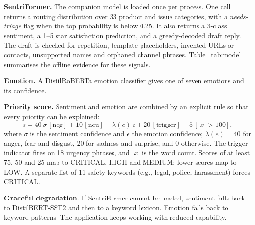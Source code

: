 \documentclass[conference]{IEEEtran}
\begin{document}
\textbf{SentriFormer.} The companion model is loaded once per process. One call returns a routing distribution over 33 product and issue categories, with a \emph{needs-triage} flag when the top probability is below 0.25. It also returns a 3-class sentiment, a 1--5 star satisfaction prediction, and a greedy-decoded draft reply. The draft is checked for repetition, template placeholders, invented URLs or contacts, unsupported names and orphaned channel phrases. Table~\ref{tab:model} summarises the offline evidence for these signals.

\textbf{Emotion.} A DistilRoBERTa emotion classifier gives one of seven emotions and its confidence.

\textbf{Priority score.} Sentiment and emotion are combined by an explicit rule so that every priority can be explained:
\begin{equation}
s = 40\,\sigma\,[\text{neg}] + 10\,[\text{neu}] + \lambda(e)\,\epsilon + 20\,[\text{trigger}] + 5\,[|x|>100],
\end{equation}
where $\sigma$ is the sentiment confidence and $\epsilon$ the emotion confidence; $\lambda(e)=40$ for anger, fear and disgust, 20 for sadness and surprise, and 0 otherwise. The trigger indicator fires on 18 urgency phrases, and $|x|$ is the word count. Scores of at least 75, 50 and 25 map to CRITICAL, HIGH and MEDIUM; lower scores map to LOW. A separate list of 11 safety keywords (e.g., legal, police, harassment) forces CRITICAL.

\textbf{Graceful degradation.} If SentriFormer cannot be loaded, sentiment falls back to DistilBERT-SST2 and then to a keyword lexicon. Emotion falls back to keyword patterns. The application keeps working with reduced capability.
\end{document}
